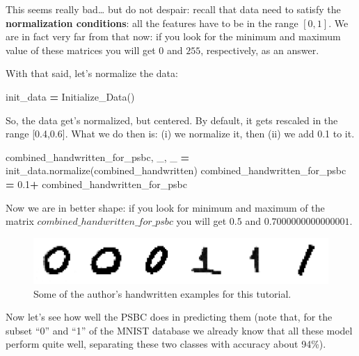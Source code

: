 \documentclass[openany,twoside]{book}
\newenvironment{Shaded}{\begin{snugshade}}{\end{snugshade}}
\newcommand{\FloatTok}[1]{\textcolor[rgb]{0.00,0.00,0.81}{#1}}
\newcommand{\NormalTok}[1]{#1}
\newcommand{\OperatorTok}[1]{\textcolor[rgb]{0.81,0.36,0.00}{\textbf{#1}}}
\begin{document}
This seems really bad\ldots{} but do not despair: recall that data need to satisfy the \textbf{normalization conditions}: all the features have to be in the range \([0,1]\). We are in fact very far from that now: if you look for the minimum and maximum value of these matrices you will get \(0\) and \(255\), respectively, as an answer.

With that said, let's normalize the data:

\begin{Shaded}
\begin{Highlighting}[]
\NormalTok{init_data }\OperatorTok{=}\NormalTok{ Initialize_Data()}
\end{Highlighting}
\end{Shaded}

So, the data get's normalized, but centered. By default, it gets rescaled in the range {[}0.4,0.6{]}. What we do then is: (i) we normalize it, then (ii) we add 0.1 to it.

\begin{Shaded}
\begin{Highlighting}[]
\NormalTok{combined_handwritten_for_psbc, _, _ }\OperatorTok{=}\NormalTok{ init_data.normalize(combined_handwritten)}
\NormalTok{combined_handwritten_for_psbc }\OperatorTok{=} \FloatTok{0.1}\OperatorTok{+}\NormalTok{ combined_handwritten_for_psbc}
\end{Highlighting}
\end{Shaded}

Now we are in better shape: if you look for minimum and maximum of the matrix \(combined\_handwritten\_for\_psbc\) you will get \(0.5\) and \(0.7000000000000001\).

\begin{figure}[htbp]
\centering
\includegraphics{figures/output_105_0.png}
\caption{Some of the author's handwritten examples for this tutorial.}
\end{figure}
Now let's see how well the PSBC does in predicting them (note that, for the subset ``0'' and ``1'' of the MNIST database we already know that all these model perform quite well, separating these two classes with accuracy about 94\%).
\end{document}
